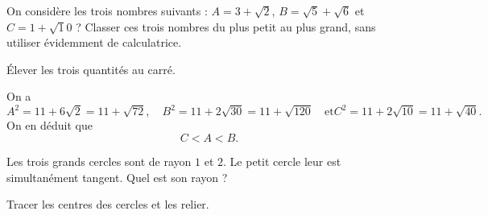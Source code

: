

\begin{exo}

On considère les trois nombres suivants : $A=3+\sqrt 2$, $B=\sqrt 5 +\sqrt 6$ et $C=1+\sqrt 10$ ?
Classer ces trois nombres du plus petit au plus grand, sans utiliser évidemment de calculatrice.
\begin{hint}
Élever les trois quantités au carré.
\end{hint}
\begin{sol}
On a 
\[
A^2 = 11+6\sqrt 2 = 11+\sqrt{72},\quad
B^2 = 11+2\sqrt{30}=11+\sqrt{120} \quad\text{et}
C^2 = 11+2\sqrt{10}=11+\sqrt{40}.\]
On en déduit que 
\[ C< A < B.\]
\end{sol}
\end{exo}


\begin{exo}
Les trois grands  cercles sont de rayon $1$ et $2$.
Le petit cercle leur est simultanément tangent. Quel est son rayon ?
\begin{center}
\end{center}
\begin{hint}
Tracer les centres des cercles et les relier.
\end{hint}
\end{exo}


